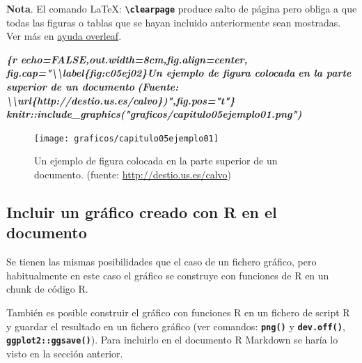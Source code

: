 \documentclass[12pt,a4paper,oneside,]{book}
\newenvironment{Shaded}{\begin{snugshade}}{\end{snugshade}}
\newcommand{\InformationTok}[1]{\textcolor[rgb]{0.56,0.35,0.01}{\textbf{\textit{#1}}}}
\numberwithin{dummy}{section}
\theoremstyle{ocrenumbox}
\theoremstyle{blacknumex}
\theoremstyle{blacknumbox}
\theoremstyle{ocrenum}
\theoremstyle{ocrenum}
\begin{document}
\textbf{Nota}. El comando LaTeX:
\textbf{\texttt{\textbackslash{}clearpage}} produce salto de página pero
obliga a que todas las figuras o tablas que se hayan incluido
anteriormente sean mostradas. Ver más en
\href{https://es.overleaf.com/learn/latex/Line_breaks_and_blank_spaces\#Espacios_verticales_en_blanco}{ayuda
overleaf}.

\begin{Shaded}
\begin{Highlighting}[]
\InformationTok{\textasciigrave{}\textasciigrave{}\textasciigrave{}\{r echo=FALSE,out.width=\textquotesingle{}8cm\textquotesingle{},fig.align=\textquotesingle{}center\textquotesingle{},}
\InformationTok{fig.cap="\textbackslash{}\textbackslash{}label\{fig:c05ej02\}Un ejemplo de figura colocada }
\InformationTok{en la parte superior de un documento }
\InformationTok{(Fuente: \textbackslash{}\textbackslash{}url\{http://destio.us.es/calvo\})",fig.pos="t"\}}
\InformationTok{knitr::include\_graphics("graficos/capitulo05ejemplo01.png")}
\InformationTok{\textasciigrave{}\textasciigrave{}\textasciigrave{}}
\end{Highlighting}
\end{Shaded}

\begin{figure}[t]

{\centering \texttt{[image: graficos/capitulo05ejemplo01]} 

}

\caption{\label{fig:c05ej02}Un ejemplo de figura colocada en la parte superior de un documento. (fuente: \url{http://destio.us.es/calvo})}\label{fig:unnamed-chunk-23}
\end{figure}

\hypertarget{incluir-un-gruxe1fico-creado-con-r-en-el-documento}{%
\subsection{Incluir un gráfico creado con R en el
documento}\label{incluir-un-gruxe1fico-creado-con-r-en-el-documento}}

Se tienen las mismas posibilidades que el caso de un fichero gráfico,
pero habitualmente en este caso el gráfico se construye con funciones de
R en un chunk de código R.

También es posible construir el gráfico con funciones R en un fichero de
script R y guardar el resultado en un fichero gráfico (ver comandos:
\textbf{\texttt{png()}} y \textbf{\texttt{dev.off()}},
\textbf{\texttt{ggplot2::ggsave()}}). Para incluirlo en el documento R
Markdown se haría lo visto en la sección anterior.
\end{document}
